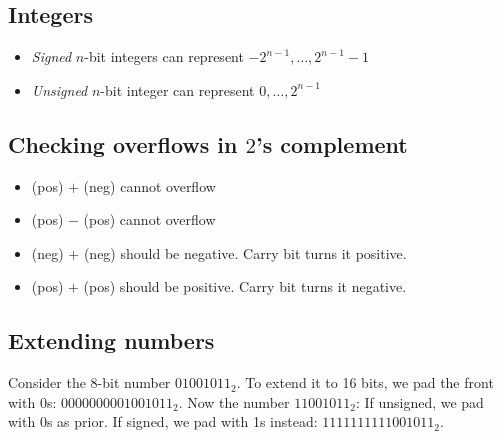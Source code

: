 \documentclass[a4paper, 11pt]{article}
\theoremstyle{definition}
\begin{document}
\subsection{Integers}
\begin{itemize}
    \item \textit{Signed} $n$-bit integers can represent $-2^{n-1}, \dots, 2^{n-1} - 1$
    \item \textit{Unsigned} $n$-bit integer can represent $0, \dots, 2^{n-1}$
\end{itemize}

\subsection{Checking overflows in $2$'s complement}
\begin{itemize}
    \item (pos) $+$ (neg) cannot overflow
    \item (pos) $-$ (pos) cannot overflow 
    \item (neg) $+$ (neg) should be negative. Carry bit turns it positive.
    \item (pos) $+$ (pos) should be positive. Carry bit turns it negative.
\end{itemize}

\subsection{Extending numbers}
Consider the 8-bit number $01001011_2$. To extend it to 16 bits, we pad the front with 0s: $0000000001001011_2$.
Now the number $11001011_2$: If unsigned, we pad with 0s as prior. If signed, we pad with 1s instead: $1111111111001011_2$.
\end{document}
